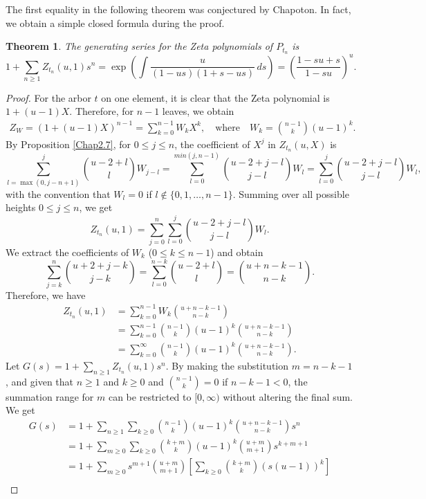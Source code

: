 \documentclass[reqno, 12pt]{article}
\newtheorem{thm}{Theorem}[section]
\theoremstyle{mydefinition}
\theoremstyle{myremark}
\begin{document}
The first equality in the following theorem was conjectured by Chapoton.
In fact, we obtain a simple closed formula during the proof.
\begin{thm}\label{Arbor-Theorem-1}
The generating series for the Zeta polynomials of $P_{t_n}$ is 
\[ 1 + \sum_{n \ge 1} Z_{t_n}(u, 1) s^n= \exp\left( \int \frac{u}{(1-us)(1+s-us)} \,ds \right)=\left( \frac{1-su+s}{1-su} \right)^u. \]
\end{thm}
\begin{proof}
For the arbor $t$ on one element, it is clear that the Zeta polynomial is $1+(u-1)X$.
Therefore, for $n-1$ leaves, we obtain
\begin{align*}
Z_W= (1+(u-1)X)^{n-1} = \sum_{k=0}^{n-1} W_k X^k, \quad \text{where} \quad W_k = \binom{n-1}{k}(u-1)^k.
\end{align*}
By Proposition \ref{Chap2.7}, for $0\leq j\leq n$, the coefficient of $X^{j}$ in $Z_{t_{n}}(u,X)$ is 
$$\sum\limits_{l=\max(0,j-n+1)}^{j}\binom{u-2+l}{l} W_{j-l}=\sum\limits_{l=0}^{min(j,n-1)}\binom{u-2+j-l}{j-l} W_{l}=\sum\limits_{l=0}^{j}\binom{u-2+j-l}{j-l} W_{l},$$
with the convention that $W_l= 0$ if $l\notin \{0,1,\ldots,n-1\}$.
Summing over all possible heights $0 \le j \le n$, we get
$$Z_{t_n}(u, 1) =\sum_{j=0}^n \sum\limits_{l=0}^{j}\binom{u-2+j-l}{j-l} W_{l}.$$
We extract the coefficients of $W_k$ ($0\leq k\leq n-1$) and obtain
$$\sum_{j=k}^n \binom{u+2+j-k}{j-k}=\sum_{l=0}^{n-k} \binom{u-2+l}{l}=\binom{u+n-k-1}{n-k}.$$
Therefore, we have
\begin{align*}
Z_{t_n}(u, 1)  &=\sum_{k=0}^{n-1} W_{k}\binom{u+n-k-1}{n-k}\\
&= \sum_{k=0}^{n-1} \binom{n-1}{k} (u-1)^k \binom{u+n-k-1}{n-k}\\
&=\sum_{k=0}^{\infty} \binom{n-1}{k} (u-1)^k \binom{u+n-k-1}{n-k}.
\end{align*}
Let $G(s) = 1 + \sum\limits_{n\geq1} Z_{t_n}(u, 1) s^n$. By making the substitution $m = n - k - 1$, and given that $n \geq 1$ and $k \geq 0$ and $\binom{n-1}{k}=0$ if $n-k-1<0$, the summation range for $m$ can be restricted to $[0,\infty)$ without altering the final sum. We get
\begin{align*}
G(s) &= 1+ \sum_{n\geq1} \sum_{k\geq0} \binom{n-1}{k} (u-1)^k \binom{u+n-k-1}{n-k} s^n\\
&= 1 + \sum_{m\geq0}\sum_{k\geq0} \binom{k+m}{k} (u-1)^k \binom{u+m}{m+1} s^{k+m+1} \\
&= 1 + \sum_{m\geq0} s^{m+1} \binom{u+m}{m+1} \left[ \sum_{k\geq0} \binom{k+m}{k} (s(u-1))^k \right] \\

\end{align*}
\end{proof}
\end{document}
